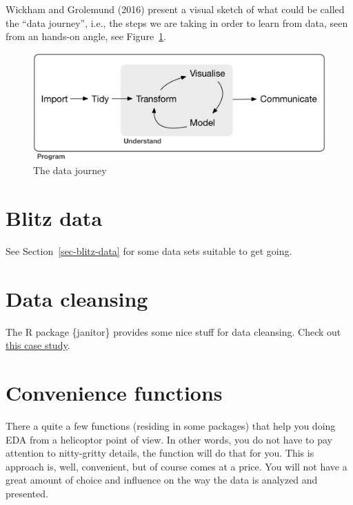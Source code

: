 \documentclass[
  letterpaper,
  DIV=11,
  numbers=noendperiod]{scrreprt}
\theoremstyle{definition}
\theoremstyle{definition}
\theoremstyle{remark}
\begin{document}
Wickham and Grolemund (2016) present a visual sketch of what could be
called the ``data journey'', i.e., the steps we are taking in order to
learn from data, seen from an hands-on angle, see
Figure~\ref{fig-data-journey}.

\begin{figure}

{\centering \includegraphics{./img/data-journey.png}

}

\caption{\label{fig-data-journey}The data journey}

\end{figure}

\hypertarget{blitz-data}{%
\section{Blitz data}\label{blitz-data}}

See Section~\ref{sec-blitz-data} for some data sets suitable to get
going.

\hypertarget{data-cleansing}{%
\section{Data cleansing}\label{data-cleansing}}

The R package \{janitor\} provides some nice stuff for data cleansing.
Check out
\href{https://www.exploringdata.org/post/how-to-clean-data-janitor-package/}{this
case study}.

\hypertarget{convenience-functions}{%
\section{Convenience functions}\label{convenience-functions}}

There a quite a few functions (residing in some packages) that help you
doing EDA from a helicoptor point of view. In other words, you do not
have to pay attention to nitty-gritty details, the function will do that
for you. This is approach is, well, convenient, but of course comes at a
price. You will not have a great amount of choice and influence on the
way the data is analyzed and presented.
\end{document}
